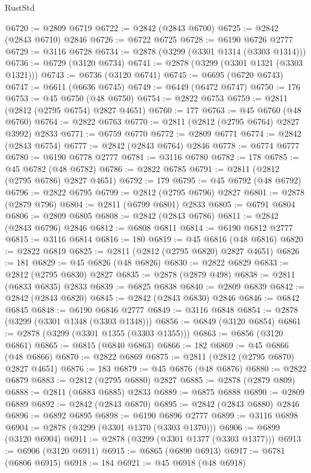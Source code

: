 \begin{lexlean}{RustStd}
\begin{coremodule}
@6720 := @2809 @6719
@6722 := @2842 (@2843 @6700)
@6725 := @2842 (@2843 @6710) @2846
@6726 := @6722 @6725
@6728 := @6190 @6726 @2777
@6729 := @3116 @6728
@6734 := @2878 (@3299 (@3301 @1314 (@3303 @1314)))
@6736 := @6729 (@3120 @6734)
@6741 := @2878 (@3299 (@3301 @1321 (@3303 @1321)))
@6743 := @6736 (@3120 @6741)
@6745 := @6695 (@6720 @6743)
@6747 := @6611 (@6636 @6745)
@6749 := @6449 (@6472 @6747)
@6750 := 176
@6753 := @45 @6750 (@48 @6750)
@6754 := @2822 @6753
@6759 := @2811 (@2812 (@2795 @6754) @2827 @4651)
@6760 := 177
@6763 := @45 @6760 (@48 @6760)
@6764 := @2822 @6763
@6770 := @2811 (@2812 (@2795 @6764) @2827 @3992) @2833
@6771 := @6759 @6770
@6772 := @2809 @6771
@6774 := @2842 (@2843 @6754)
@6777 := @2842 (@2843 @6764) @2846
@6778 := @6774 @6777
@6780 := @6190 @6778 @2777
@6781 := @3116 @6780
@6782 := 178
@6785 := @45 @6782 (@48 @6782)
@6786 := @2822 @6785
@6791 := @2811 (@2812 (@2795 @6786) @2827 @4651)
@6792 := 179
@6795 := @45 @6792 (@48 @6792)
@6796 := @2822 @6795
@6799 := @2812 (@2795 @6796) @2827
@6801 := @2878 (@2879 @796)
@6804 := @2811 (@6799 @6801) @2833
@6805 := @6791 @6804
@6806 := @2809 @6805
@6808 := @2842 (@2843 @6786)
@6811 := @2842 (@2843 @6796) @2846
@6812 := @6808 @6811
@6814 := @6190 @6812 @2777
@6815 := @3116 @6814
@6816 := 180
@6819 := @45 @6816 (@48 @6816)
@6820 := @2822 @6819
@6825 := @2811 (@2812 (@2795 @6820) @2827 @4651)
@6826 := 181
@6829 := @45 @6826 (@48 @6826)
@6830 := @2822 @6829
@6833 := @2812 (@2795 @6830) @2827
@6835 := @2878 (@2879 @498)
@6838 := @2811 (@6833 @6835) @2833
@6839 := @6825 @6838
@6840 := @2809 @6839
@6842 := @2842 (@2843 @6820)
@6845 := @2842 (@2843 @6830) @2846
@6846 := @6842 @6845
@6848 := @6190 @6846 @2777
@6849 := @3116 @6848
@6854 := @2878 (@3299 (@3301 @1348 (@3303 @1348)))
@6856 := @6849 (@3120 @6854)
@6861 := @2878 (@3299 (@3301 @1355 (@3303 @1355)))
@6863 := @6856 (@3120 @6861)
@6865 := @6815 (@6840 @6863)
@6866 := 182
@6869 := @45 @6866 (@48 @6866)
@6870 := @2822 @6869
@6875 := @2811 (@2812 (@2795 @6870) @2827 @4651)
@6876 := 183
@6879 := @45 @6876 (@48 @6876)
@6880 := @2822 @6879
@6883 := @2812 (@2795 @6880) @2827
@6885 := @2878 (@2879 @809)
@6888 := @2811 (@6883 @6885) @2833
@6889 := @6875 @6888
@6890 := @2809 @6889
@6892 := @2842 (@2843 @6870)
@6895 := @2842 (@2843 @6880) @2846
@6896 := @6892 @6895
@6898 := @6190 @6896 @2777
@6899 := @3116 @6898
@6904 := @2878 (@3299 (@3301 @1370 (@3303 @1370)))
@6906 := @6899 (@3120 @6904)
@6911 := @2878 (@3299 (@3301 @1377 (@3303 @1377)))
@6913 := @6906 (@3120 @6911)
@6915 := @6865 (@6890 @6913)
@6917 := @6781 (@6806 @6915)
@6918 := 184
@6921 := @45 @6918 (@48 @6918)

\end{coremodule}
\end{lexlean}
